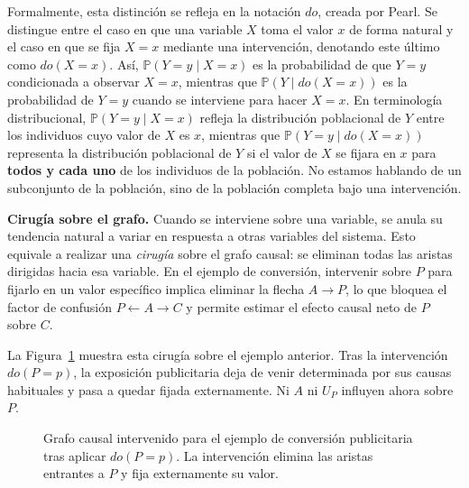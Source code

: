 \documentclass[12pt]{report} %
\begin{document}
Formalmente, esta distinción se refleja en la notación $do$, creada por Pearl. Se distingue entre el caso en que una variable $X$ toma el valor $x$ de forma natural y el caso en que se fija $X = x$ mediante una intervención, denotando este último como $do(X = x)$. Así, $\mathbb{P}(Y = y \mid X = x)$ es la probabilidad de que $Y = y$ condicionada a observar $X = x$, mientras que $\mathbb{P}(Y \mid do(X = x))$ es la probabilidad de $Y = y$ cuando se interviene para hacer $X = x$. En terminología distribucional, $\mathbb{P}(Y = y \mid X = x)$ refleja la distribución poblacional de $Y$ entre los individuos cuyo valor de $X$ es $x$, mientras que $\mathbb{P}(Y = y \mid do(X = x))$ representa la distribución poblacional de $Y$ si el valor de $X$ se fijara en $x$ para \textbf{todos y cada uno} de los individuos de la población. No estamos hablando de un subconjunto de la población, sino de la población completa bajo una intervención.

\textbf{Cirugía sobre el grafo.} Cuando se interviene sobre una variable, se anula su tendencia natural a variar en respuesta a otras variables del sistema. Esto equivale a realizar una \textit{cirugía} sobre el grafo causal: se eliminan todas las aristas dirigidas hacia esa variable. En el ejemplo de conversión, intervenir sobre $P$ para fijarlo en un valor específico implica eliminar la flecha $A \to P$, lo que bloquea el factor de confusión $P \leftarrow A \rightarrow C$ y permite estimar el efecto causal neto de $P$ sobre $C$.

La Figura~\ref{fig:dag_conversion_publicidad_intervenido} muestra esta cirugía sobre el ejemplo anterior. Tras la intervención $do(P=p)$, la exposición publicitaria deja de venir determinada por sus causas habituales y pasa a quedar fijada externamente. Ni $A$ ni $U_P$ influyen ahora sobre $P$.

\begin{figure}[H]
    \centering
    \begingroup
    \shorthandoff{<>}
    \endgroup
    \caption[DAG intervenido de conversión publicitaria]{Grafo causal intervenido para el ejemplo de conversión publicitaria tras aplicar $do(P=p)$. La intervención elimina las aristas entrantes a $P$ y fija externamente su valor.}
    \label{fig:dag_conversion_publicidad_intervenido}
\end{figure}
\end{document}
